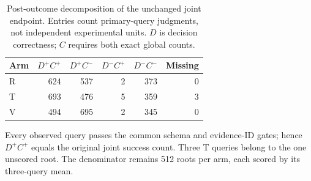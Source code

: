 \begin{table}[htbp]
\centering\footnotesize
\caption{Post-outcome decomposition of the unchanged joint endpoint. Entries count primary-query judgments, not independent experimental units. $D$ is decision correctness; $C$ requires both exact global counts.}
\label{tab:workflow-decomposition}
\begin{tabular}{@{}lrrrrr@{}}
\toprule
Arm & $D^+C^+$ & $D^+C^-$ & $D^-C^+$ & $D^-C^-$ & Missing\\
\midrule
R & 624 & 537 & 2 & 373 & 0\\
T & 693 & 476 & 5 & 359 & 3\\
V & 494 & 695 & 2 & 345 & 0\\
\bottomrule
\end{tabular}
\par\smallskip\raggedright\footnotesize
Every observed query passes the common schema and evidence-ID gates; hence $D^+C^+$ equals the original joint success count. Three T queries belong to the one unscored root. The denominator remains 512 roots per arm, each scored by its three-query mean.
\end{table}
